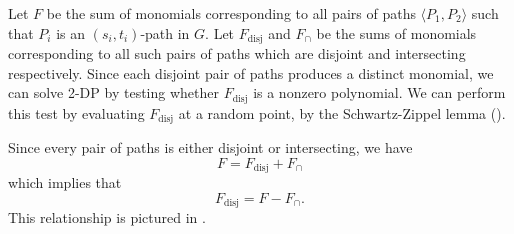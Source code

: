 \documentclass[11pt]{article}
\newcommand{\pair}[1]{\langle #1\rangle}
\DeclareMathOperator{\disj}{disj}
\theoremstyle{definition}
\begin{document}
Let $F$ be the sum of monomials corresponding to all pairs of paths $\pair{P_1,P_2}$ such that $P_i$ is an $(s_i,t_i)$-path in $G$.
Let $F_{\disj}$ and $F_{\cap}$ be the sums of monomials corresponding to all such pairs of paths which are disjoint and intersecting respectively.
Since each disjoint pair of paths produces a distinct monomial, we can solve \textsf{2-DP} by testing whether $F_{\disj}$ is a nonzero polynomial. 
We can perform this test by evaluating $F_{\disj}$ at a random point, by the Schwartz-Zippel lemma ().





Since every pair of paths is either disjoint or intersecting, we have 
    \[F = F_{\disj} + F_{\cap}\]
which implies that 
    \[F_{\disj} = F - F_{\cap}.\]
This relationship is pictured in .
\end{document}

